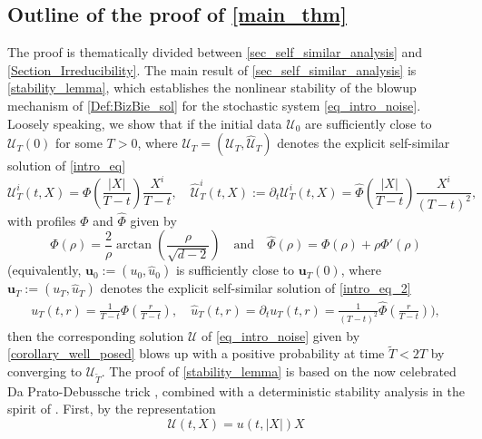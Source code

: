 \documentclass[12pt,reqno]{amsart}
\theoremstyle{plain}
\theoremstyle{remark}
\theoremstyle{plain}
\theoremstyle{definition}
\numberwithin{equation}{section}
\numberwithin{equation}{section}
\begin{document}
	\subsection{Outline of the proof of \autoref{main_thm}}\label{sec_strategy}
	The proof is thematically divided between \autoref{sec_self_similar_analysis} and \autoref{Section_Irreducibility}. 
	The main result of \autoref{sec_self_similar_analysis} is \autoref{stability_lemma}, which establishes the nonlinear stability of the blowup mechanism of \eqref{Def:BizBie_sol} for the stochastic  system \eqref{eq_intro_noise}. Loosely speaking, we show that if the initial data $\boldsymbol{\mathcal{U}}_0$ are sufficiently close to $\boldsymbol{\mathcal{U}}_{T}(0)$ for some $T>0$, where $\boldsymbol{\mathcal{U}}_{T}=(\mathcal{U}_{T},\hat{\mathcal{U}}_T)$ denotes the explicit self-similar solution of \eqref{intro_eq}
	\begin{equation*}
		\mathcal{U}^i_T(t,X)= \Phi\left( \frac{|X|}{T-t} \right)\frac{X^i}{T-t}, \quad \hat{\mathcal{U}}^i_T(t,X):=\partial_t \mathcal{U}_T^i(t,X)= \hat{\Phi}\left( \frac{|X|}{T-t} \right)\frac{X^i}{(T-t)^2},
	\end{equation*}
	with profiles $\Phi$ and $\hat{\Phi}$ given by
	\begin{equation}\label{vector_self_similar_blow_up}
		\Phi(\rho)=\frac{2}{\rho}\arctan\left(\frac{\rho}{\sqrt{d-2}}\right)\quad  \text{and} \quad\hat{{\Phi}}(\rho)=\Phi(\rho)+\rho \Phi'(\rho)
	\end{equation}
	(equivalently, $\mathbf{{u}}_0:=(u_0,\hat{u}_0)$ is sufficiently close to $\mathbf{{u}}_{T}(0)$, where ${\mathbf{{u}}}_{T}:=(u_{T},\hat{u}_T)$ denotes the explicit self-similar solution of \eqref{intro_eq_2}
	\begin{align}\label{SS_sol}
    u_{T}(t,r)=\frac{1}{{T}-t}\Phi\left(\frac{r}{{T}-t}\right),\quad 
		\hat{u}_{T}(t,r)=\partial_t u_{T}(t,r)=\frac{1}{({T}-t)^2}\hat{\Phi}\left(\frac{r}{{T}-t}\right)\bigg),
	\end{align}
	then the corresponding solution $\mathcal{U}$ of \eqref{eq_intro_noise} given by \autoref{corollary_well_posed} blows up with a positive probability at time $\tilde{T}<2T$ by converging to $\mathcal{U}_{\tilde{T}}$. The proof of \autoref{stability_lemma} is based on the now celebrated Da Prato-Debussche trick \cite{da2002two}, combined with a deterministic stability analysis in the spirit of \cite{glogic2025globally}. 
	First, by the representation 
	\begin{equation}\label{Def:U_u}
		\mathcal{U}(t,X)=u(t,\lvert X\rvert)X
	\end{equation}
\end{document}
